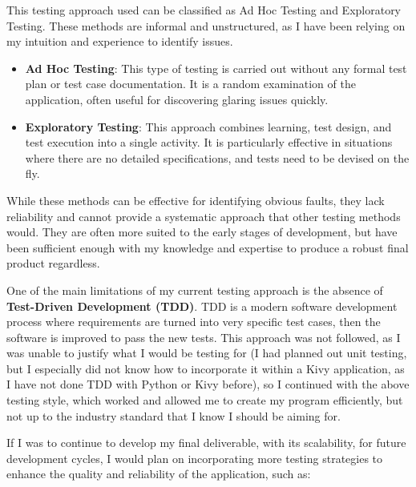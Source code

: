 \documentclass{article}
\begin{document}
This testing approach used can be classified as Ad Hoc Testing and Exploratory Testing. These methods are informal and unstructured, as I have been relying on my intuition and experience to identify issues.
\newpage
\begin{itemize}
    \item \textbf{Ad Hoc Testing}: This type of testing is carried out without any formal test plan or test case documentation. It is a random examination of the application, often useful for discovering glaring issues quickly.
    \item \textbf{Exploratory Testing}: This approach combines learning, test design, and test execution into a single activity. It is particularly effective in situations where there are no detailed specifications, and tests need to be devised on the fly.
\end{itemize}

While these methods can be effective for identifying obvious faults, they lack reliability and cannot provide a systematic approach that other testing methods would. They are often more suited to the early stages of development, but have been sufficient enough with my knowledge and expertise to produce a robust final product regardless.\\\vspace{0.3cm}

One of the main limitations of my current testing approach is the absence of \textbf{Test-Driven Development (TDD)}. TDD is a modern software development process where requirements are turned into very specific test cases, then the software is improved to pass the new tests. This approach was not followed, as I was unable to justify what I would be testing for (I had planned out unit testing, but I especially did not know how to incorporate it within a Kivy application, as I have not done TDD with Python or Kivy before), so I continued with the above testing style, which worked and allowed me to create my program efficiently, but not up to the industry standard that I know I should be aiming for.\\\vspace{0.3cm}

If I was to continue to develop my final deliverable, with its scalability, for future development cycles, I would plan on incorporating more testing strategies to enhance the quality and reliability of the application, such as:
\end{document}
